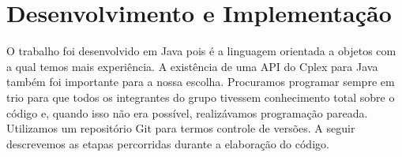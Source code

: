 
\section{Desenvolvimento e Implementação}
\label{sec:implementacao}

O trabalho foi desenvolvido em Java pois é a linguagem orientada a objetos com a qual temos mais
experiência. A existência de uma API do Cplex para Java também foi importante para a nossa escolha.
Procuramos programar sempre em trio para que todos os integrantes do grupo tivessem conhecimento
total sobre o código e, quando isso não era possível, realizávamos programação pareada. Utilizamos
um repositório Git para termos controle de versões. A seguir descrevemos as etapas percorridas 
durante a elaboração do código.

